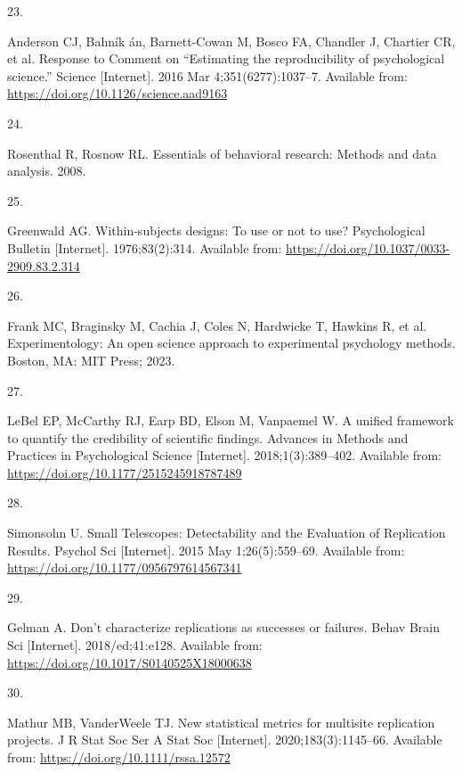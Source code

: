 \documentclass[
  english,
  a4paper,
]{article}
\newlength{\cslhangindent}
\newlength{\csllabelwidth}
\newenvironment{CSLReferences}[2] %
{\begin{list}{}{%
			\setlength{\itemindent}{0pt}
			\setlength{\leftmargin}{0pt}
			\setlength{\parsep}{0pt}
			\ifodd #1
			\setlength{\leftmargin}{\cslhangindent}
			\setlength{\itemindent}{-1\cslhangindent}
			\fi
			\setlength{\itemsep}{#2\baselineskip}}}
	{\end{list}}
\newcommand{\CSLLeftMargin}[1]{\parbox[t]{\csllabelwidth}{\strut#1\strut}}
\newcommand{\CSLRightInline}[1]{\parbox[t]{\linewidth - \csllabelwidth}{\strut#1\strut}}
\begin{document}
\begin{CSLReferences}{0}{1}
\CSLLeftMargin{23. }%
\CSLRightInline{Anderson CJ, Bahník án, Barnett-Cowan M, Bosco FA, Chandler J, Chartier CR, et al. Response to {Comment} on {``{Estimating} the reproducibility of psychological science.''} Science {[}Internet{]}. 2016 Mar 4;351(6277):1037--7. Available from: \url{https://doi.org/10.1126/science.aad9163}}

\CSLLeftMargin{24. }%
\CSLRightInline{Rosenthal R, Rosnow RL. Essentials of behavioral research: Methods and data analysis. 2008. }

\CSLLeftMargin{25. }%
\CSLRightInline{Greenwald AG. Within-subjects designs: To use or not to use? Psychological Bulletin {[}Internet{]}. 1976;83(2):314. Available from: \url{https://doi.org/10.1037/0033-2909.83.2.314}}

\CSLLeftMargin{26. }%
\CSLRightInline{Frank MC, Braginsky M, Cachia J, Coles N, Hardwicke T, Hawkins R, et al. Experimentology: An open science approach to experimental psychology methods. Boston, MA: MIT Press; 2023. }

\CSLLeftMargin{27. }%
\CSLRightInline{LeBel EP, McCarthy RJ, Earp BD, Elson M, Vanpaemel W. A unified framework to quantify the credibility of scientific findings. Advances in Methods and Practices in Psychological Science {[}Internet{]}. 2018;1(3):389--402. Available from: \url{https://doi.org/10.1177/2515245918787489}}

\CSLLeftMargin{28. }%
\CSLRightInline{Simonsohn U. Small {Telescopes}: {Detectability} and the {Evaluation} of {Replication Results}. Psychol Sci {[}Internet{]}. 2015 May 1;26(5):559--69. Available from: \url{https://doi.org/10.1177/0956797614567341}}

\CSLLeftMargin{29. }%
\CSLRightInline{Gelman A. Don't characterize replications as successes or failures. Behav Brain Sci {[}Internet{]}. 2018/ed;41:e128. Available from: \url{https://doi.org/10.1017/S0140525X18000638}}

\CSLLeftMargin{30. }%
\CSLRightInline{Mathur MB, VanderWeele TJ. New statistical metrics for multisite replication projects. J R Stat Soc Ser A Stat Soc {[}Internet{]}. 2020;183(3):1145--66. Available from: \url{https://doi.org/10.1111/rssa.12572}}


\end{CSLReferences}
\end{document}
